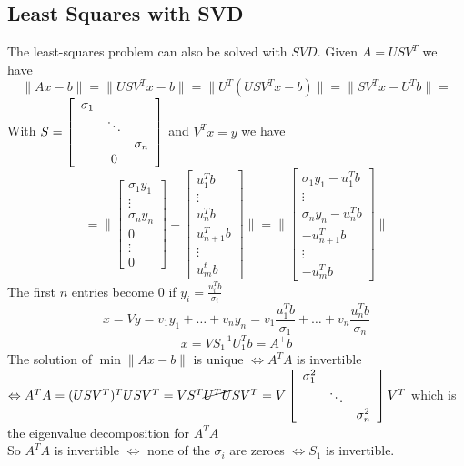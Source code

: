 \documentclass[10pt]{report}
\begin{document}
\subsection{Least Squares with SVD}
The least-squares problem can also be solved with $SVD$. Given $A=USV^T$ we have $$\|Ax-b\| = \|USV^Tx-b\| = \|U^T(USV^Tx - b)\| = \|SV^Tx-U^Tb\| =$$
With $S =\left[\begin{array}{c c c}
\sigma_1\\
& \ddots\\
& & \sigma_n\\
& 0
\end{array}\right]$ and $V^Tx = y$ we have
$$=\|\left[\begin{array}{c}
\sigma_1y_1\\\vdots\\\sigma_ny_n\\0\\\vdots\\0
\end{array}\right] - \left[\begin{array}{c}
u_1^Tb\\\vdots\\u_n^Tb\\u_{n+1}^Tb\\\vdots\\u_m^tb
\end{array}\right] \| = \|\left[\begin{array}{c}
\sigma_1y_1-u_1^Tb\\\vdots\\\sigma_ny_n-u_n^Tb\\-u_{n+1}^Tb\\\vdots\\-u_m^Tb
\end{array}\right]\|$$
The first $n$ entries become $0$ if $y_i = \frac{u_i^Tb}{\sigma_i}$\\
$$x = Vy = v_1y_1 + \ldots + v_ny_n = v_1\frac{u_1^Tb}{\sigma_1} + \ldots + v_n\frac{u_n^Tb}{\sigma_n}$$
$$x = VS_1^{-1}U_1^Tb = A^+b$$
The solution of $\min \|Ax-b\|$ is unique $\Leftrightarrow A^TA$ is invertible $\Leftrightarrow A^TA=(USV^T)^TUSV^T = VS^T\cancel{U^TU}SV^T = V\left[\begin{array}{c c c}
\sigma_1^2\\
& \ddots\\
& & \sigma_n^2
\end{array}\right]V^T$ which is the eigenvalue decomposition for $A^TA$\\
So $A^TA$ is invertible $\Leftrightarrow$ none of the $\sigma_i$ are zeroes $\Leftrightarrow S_1$ is invertible.\\
\end{document}
